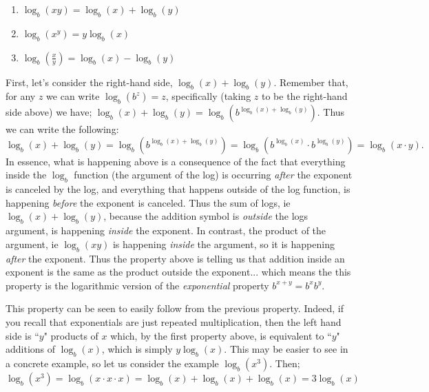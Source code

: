         \begin{enumerate}
            \item $\log_b(xy) = \log_b(x) + \log_b(y)$
            \item $\log_b(x^y) = y\log_b(x)$
            \item $\log_b\left(\frac{x}{y}\right) = \log_b(x) - \log_b(y)$
        \end{enumerate}
        
            
            First, let's consider the right-hand side, $\log_b(x) + \log_b(y)$. Remember that, for any $z$ we can write $\log_b(b^z) = z$, specifically (taking $z$ to be the right-hand side above) we have; $\log_b(x) + \log_b(y) = \log_b\left( b^{\log_b(x) + \log_b(y)} \right)$. Thus we can write the following:
            \[
                \log_b(x) + \log_b(y)   = \log_b\left( b^{\log_b(x) + \log_b(y)} \right) 
                                        = \log_b\left( b^{\log_b(x)}\cdot b^{\log_b(y)}\right) 
                                        = \log_b(x \cdot y).
            \]
            In essence, what is happening above is a consequence of the fact that everything inside the $\log_b$ function (the argument of the log) is occurring \textit{after} the exponent is canceled by the log, and everything that happens outside of the log function, is happening \textit{before} the exponent is canceled. Thus the sum of logs, ie $\log_b(x) + \log_b(y)$, because the addition symbol is \textit{outside} the logs argument, is happening \textit{inside} the exponent. In contrast, the product of the argument, ie $\log_b(xy)$ is happening \textit{inside} the argument, so it is happening \textit{after} the exponent. Thus the property above is telling us that addition inside an exponent is the same as the product outside the exponent... which means the this property is the logarithmic version of the \textit{exponential} property $b^{x+y} = b^xb^y$.
            
            This property can be seen to easily follow from the previous property. Indeed, if you recall that exponentials are just repeated multiplication, then the left hand side is ``$y$" products of $x$ which, by the first property above, is equivalent to ``$y$" additions of $\log_b(x)$, which is simply $y\log_b(x)$. This may be easier to see in a concrete example, so let us consider the example $\log_b (x^3)$. Then;
            \[
                \log_b(x^3) = \log_b(x\cdot x\cdot x) = \log_b(x) + \log_b(x) + \log_b(x) = 3\log_b(x)
            \]
        
